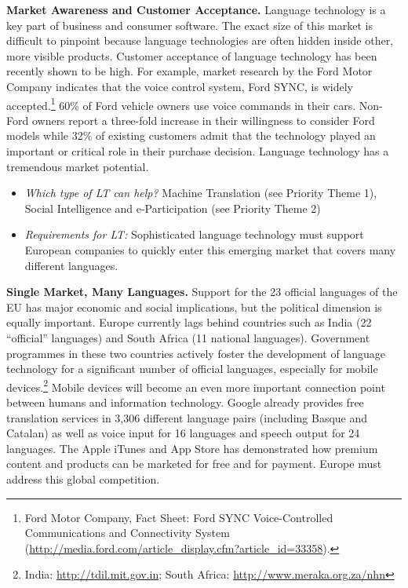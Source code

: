 \begin{multicols}{2}
\textbf{Market Awareness and Customer Acceptance.} Language technology is a key part of business and consumer software. The exact size of this market is difficult to pinpoint because language technologies are often hidden inside other, more visible products. Customer acceptance of language technology has been recently shown to be high. For example, market research by the Ford Motor Company indicates that the voice control system, Ford SYNC, is widely accepted.\footnote{Ford Motor Company, Fact Sheet: Ford SYNC Voice-Controlled Communications and Connectivity System (\url{http://media.ford.com/article_display.cfm?article_id=33358}).} 60\% of Ford vehicle owners use voice commands in their cars. Non-Ford owners report a three-fold increase in their willingness to consider Ford models while 32\% of existing customers admit that the technology played an important or critical role in their purchase decision. Language technology has a tremendous market potential.

\begin{itemize}
\item \emph{Which type of LT can help?} Machine Translation (see Priority Theme 1), Social Intelligence and e-Participation (see Priority Theme 2)
\item \emph{Requirements for LT:} Sophisticated language technology must support European companies to quickly enter this emerging market that covers many different languages.
\end{itemize}

\textbf{Single Market, Many Languages.} Support for the 23 official languages of the EU has major economic and social implications, but the political dimension is equally important. Europe currently lags behind countries such as India (22 “official” languages) and South Africa (11 national languages). Government programmes in these two countries actively foster the development of language technology for a significant number of official languages, especially for mobile devices.\footnote{India: \url{http://tdil.mit.gov.in}; South Africa: \url{http://www.meraka.org.za/nhn}} Mobile devices will become an even more important connection point between humans and information technology. Google already provides free translation services in 3,306 different language pairs (including Basque and Catalan) as well as voice input for 16 languages and speech output for 24 languages. The Apple iTunes and App Store has demonstrated how premium content and products can be marketed for free and for payment. Europe must address this global competition. 


\end{multicols}
